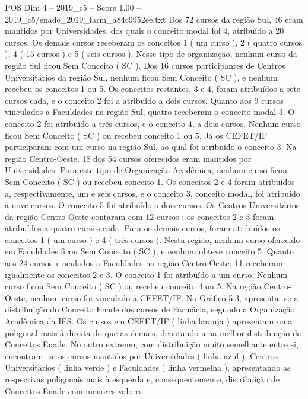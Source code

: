 \begin{textsample}{POS Dim 4 – 2019\_c5 – Score 1.00 – 2019\_c5/enade\_2019\_farm\_a84c9952ee.txt}
Dos 72 cursos da região Sul, 46 eram mantidos por Universidades, dos quais o conceito modal foi 4, atribuído a 20 cursos.
Os demais cursos receberam os conceitos 1 ( um curso ), 2 ( quatro cursos ), 4 ( 15 cursos ) e 5 ( seis cursos ).
Nesse tipo de organização, nenhum curso da região Sul ficou Sem Conceito ( SC ).
Dos 16 cursos participantes de Centros Universitários da região Sul, nenhum ficou Sem Conceito ( SC ), e nenhum recebeu os conceitos 1 ou 5.
Os conceitos restantes, 3 e 4, foram atribuídos a sete cursos cada, e o conceito 2 foi a atribuído a dois cursos.
Quanto aos 9 cursos vinculados a Faculdades na região Sul, quatro receberam o conceito modal 3.
O conceito 2 foi atribuído a três cursos, e o conceito 4, a dois cursos.
Nenhum curso ficou Sem Conceito ( SC ) ou recebeu conceito 1 ou 5.
Já os CEFET/IF participaram com um curso na região Sul, ao qual foi atribuído o conceito 3.
Na região Centro-Oeste, 18 dos 54 cursos oferecidos eram mantidos por Universidades.
Para este tipo de Organização Acadêmica, nenhum curso ficou Sem Conceito ( SC ) ou recebeu conceito 1.
Os conceitos 2 e 4 foram atribuídos a, respectivamente, um e seis cursos, e o conceito 3, conceito modal, foi atribuído a nove cursos.
O conceito 5 foi atribuído a dois cursos.
Os Centros Universitários da região Centro-Oeste contaram com 12 cursos : os conceitos 2 e 3 foram atribuídos a quatro cursos cada.
Para os demais cursos, foram atribuídos os conceitos 1 ( um curso ) e 4 ( três cursos ).
Nesta região, nenhum curso oferecido em Faculdades ficou Sem Conceito ( SC ), e nenhum obteve conceito 5.
Quanto aos 24 cursos vinculados a Faculdades na região Centro-Oeste, 11 receberam igualmente os conceitos 2 e 3.
O conceito 1 foi atribuído a um curso.
Nenhum curso ficou Sem Conceito ( SC ) ou recebeu conceito 4 ou 5.
Na região Centro-Oeste, nenhum curso foi vinculado a CEFET/IF.
No Gráfico 5.3, apresenta -se a distribuição do Conceito Enade dos cursos de Farmácia, segundo a Organização Acadêmica da IES.
Os cursos em CEFET/IF ( linha laranja ) apresentam uma poligonal mais à direita do que as demais, denotando uma melhor distribuição de Conceitos Enade.
No outro extremo, com distribuição muito semelhante entre si, encontram -se os cursos mantidos por Universidades ( linha azul ), Centros Universitários ( linha verde ) e Faculdades ( linha vermelha ), apresentando as respectivas poligonais mais à esquerda e, consequentemente, distribuição de Conceitos Enade com menores valores.

\end{textsample}
